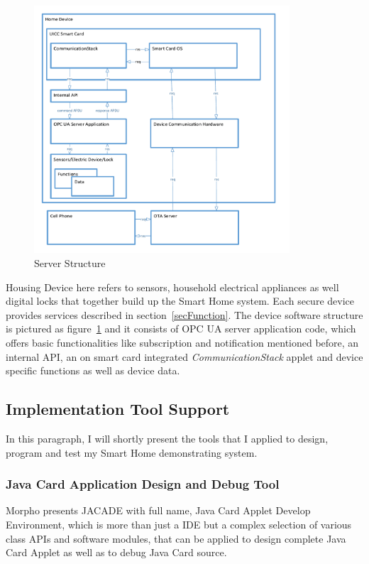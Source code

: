 \begin{figure}[!htb]
	\centering
	\includegraphics[width=0.85\textwidth]{serverStructure}
		\caption{Server Structure}
	\label{fig:serverStructure}
\end{figure}
Housing Device here refers to sensors, household electrical appliances as well digital locks that together build up the Smart Home system. Each secure device provides services described in section~\ref{secFunction}. The device software structure is pictured as figure~\ref{fig:serverStructure} and it consists of OPC UA server application code, which offers basic functionalities like subscription and notification mentioned before, an internal API, an on smart card integrated \emph{CommunicationStack} applet and device specific functions as well as device data.

\subsection{Implementation Tool Support} \label{secTS}
In this paragraph, I will shortly present the tools that I applied to design, program and test my Smart Home demonstrating system.
\subsubsection{Java Card Application Design and Debug Tool}
Morpho presents JACADE with full name, Java Card Applet Develop Environment, which is more than just a IDE but a complex selection of various class APIs and software modules, that can be applied to design complete Java Card Applet as well as to debug Java Card source. 
